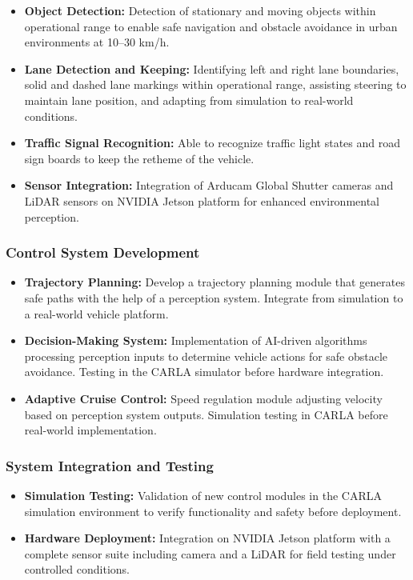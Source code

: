\documentclass[12pt, a4paper]{report}
\begin{document}
\begin{itemize}
    \item \textbf{Object Detection:} Detection of stationary and moving objects within operational range to enable safe navigation and obstacle avoidance in urban environments at 10--30 km/h.
    \item \textbf{Lane Detection and Keeping:} Identifying left and right lane boundaries, solid and dashed lane markings within operational range, assisting steering to maintain lane position, and adapting from simulation to real-world conditions.
    \item \textbf{Traffic Signal Recognition:} Able to recognize traffic light states and road sign boards to keep the retheme of the vehicle.
    \item \textbf{Sensor Integration:} Integration of Arducam Global Shutter cameras and \ac{LiDAR} sensors on NVIDIA Jetson platform for enhanced environmental perception.
\end{itemize}

\subsubsection{Control System Development}

\begin{itemize}
    \item \textbf{Trajectory Planning:} Develop a trajectory planning module that generates safe paths with the help of a perception system. Integrate from simulation to a real-world vehicle platform.
    \item \textbf{Decision-Making System:} Implementation of AI-driven algorithms processing perception inputs to determine vehicle actions for safe obstacle avoidance. Testing in the \ac{CARLA} simulator before hardware integration.
    \item \textbf{Adaptive Cruise Control:} Speed regulation module adjusting velocity based on perception system outputs. Simulation testing in \ac{CARLA} before real-world implementation.
\end{itemize}

\subsubsection{System Integration and Testing}

\begin{itemize}
  \item \textbf{Simulation Testing:} Validation of new control modules in the \ac{CARLA} simulation environment to verify functionality and safety before deployment.
    \item \textbf{Hardware Deployment:} Integration on NVIDIA Jetson platform with a complete sensor suite including camera and a \ac{LiDAR} for field testing under controlled conditions.
\end{itemize}
\end{document}
